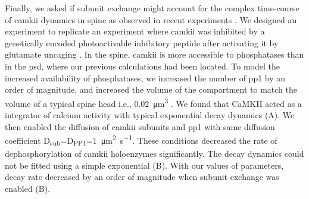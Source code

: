 \documentclass[9pt,lineno,doublespacing]{elife}
\newcommand\SUB[2]{#1\textsubscript{#2}}
\begin{document}
Finally, we asked if subunit exchange might account for the complex time-course
of \gls{camkii} dynamics in spine as observed in recent experiments
\citep{chang_camkii_2017}. We designed an experiment to replicate an experiment
where \gls{camkii} was inhibited by a genetically encoded photoactivable
inhibitory peptide after activating it by glutamate uncaging
\citep{murakoshi_kinetics_2017}. In the spine, \gls{camkii} is more accessible to
phosphatases than in the \gls{psd}, where our previous calculations had been
located. To model the increased availability of phosphatases, we increased the
number of \gls{pp1} by an order of magnitude, and increased the volume of the
compartment to match the volume of a typical spine head i.e.,
\SI{0.02}{\cubic\micro\meter} \citep{bartol_nanoconnectomic_2015}. We found that
CaMKII acted as a integrator of calcium activity with typical exponential decay
dynamics (A). We then enabled the diffusion of
\gls{camkii} subunits and \gls{pp1} with same diffusion coefficient
\SUB{D}{sub}=\SUB{D}{PP1}=\SI{1}{\micro\meter\squared\per\second}.  These
conditions decreased the rate of dephosphorylation of \gls{camkii} holoenzymes
significantly. The decay dynamics could not be fitted using a simple exponential
(B). With our values of parameters, decay rate
decreased by an order of magnitude when subunit exchange was enabled
(B).
\end{document}
